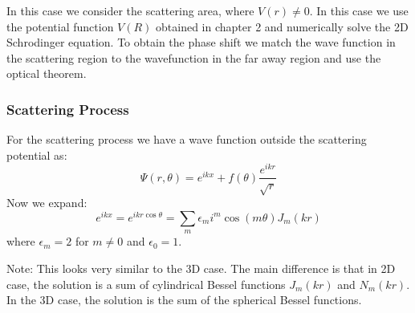 In this case we consider the scattering area, where $ V(r) \neq 0 $. In this case we use the potential function $ V(R) $ obtained in chapter 2 and numerically solve the 2D Schrodinger equation. To obtain the phase shift we match the wave function in the scattering region to the wavefunction in the far away region and use the optical theorem.

\subsubsection{Scattering Process}

For the scattering process we have a wave function outside the scattering potential as:
\begin{equation}\label{sctPhi}
 \Psi(r,\theta) = e^{ikx} + f(\theta)\frac{e^{ikr}}{\sqrt{r}}
\end{equation}
Now we expand:
\begin{equation}\label{expE}
e^{ikx} = e^{ikr\cos\theta} = \sum_m{\epsilon_m i^m \cos(m\theta)J_m(kr)}
\end{equation}
where $\epsilon_m = 2 $ for $ m \neq 0 $ and $ \epsilon_0 = 1 $.

Note: This looks very similar to the 3D case. The main difference is that in 2D case, the solution is a sum of cylindrical Bessel functions $ J_m(kr) $ and $ N_m(kr) $.
In the 3D case, the solution is the sum of the spherical Bessel functions.

